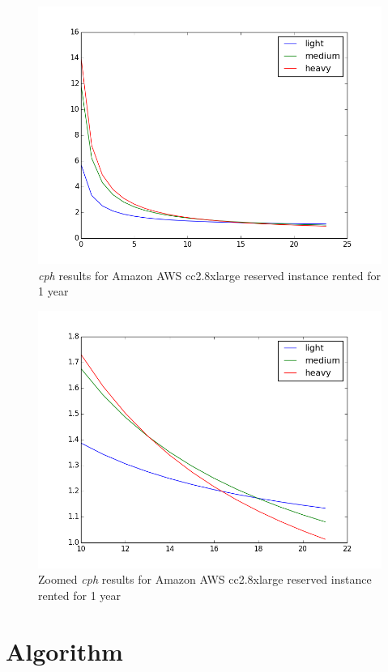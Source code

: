 \documentclass[]{final_report}
\begin{document}
\begin{figure}[H]
	\includegraphics[width=\linewidth]{figures/cc2_8xlarge}
	\caption{\textit{cph} results for Amazon AWS cc2.8xlarge reserved instance rented for 1 year~\cite{AWS:2014}}
	\label{fig:cc2_8xlarge}
\end{figure}

\begin{figure}[H]
	\includegraphics[width=\linewidth]{figures/cph_cc2_8xlarge_zoom}
	\caption{Zoomed \textit{cph} results for Amazon AWS cc2.8xlarge reserved instance rented for 1 year~\cite{AWS:2014}}
	\label{fig:cph_cc2_8xlarge_zoom}
\end{figure}


\section{Algorithm}
\end{document}
